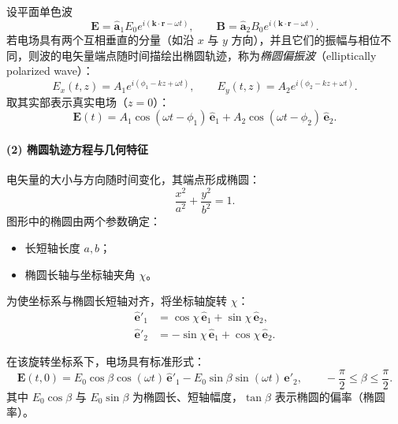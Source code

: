 设平面单色波
\begin{equation}
  \mathbf{E} = \hat{\mathbf{a}}_1 E_0 e^{i(\mathbf{k}\cdot\mathbf{r}-\omega t)}, \qquad
  \mathbf{B} = \hat{\mathbf{a}}_2 B_0 e^{i(\mathbf{k}\cdot\mathbf{r}-\omega t)} .
\end{equation}
若电场具有两个互相垂直的分量（如沿 $x$ 与 $y$ 方向），并且它们的振幅与相位不同，则波的电矢量端点随时间描绘出椭圆轨迹，称为\emph{椭圆偏振波}（elliptically polarized wave）：
\begin{equation}
  E_x(t,z) = A_1 e^{i(\phi_1 - kz + \omega t)},\qquad
  E_y(t,z) = A_2 e^{i(\phi_2 - kz + \omega t)} .
\end{equation}
取其实部表示真实电场（$z=0$）：
\begin{equation}
  \mathbf{E}(t)
  = A_1 \cos(\omega t - \phi_1)\,\hat{\mathbf{e}}_1
  + A_2 \cos(\omega t - \phi_2)\,\hat{\mathbf{e}}_2 .
\end{equation}

\paragraph{(2) 椭圆轨迹方程与几何特征}
电矢量的大小与方向随时间变化，其端点形成椭圆：
\[
\frac{x^2}{a^2}+\frac{y^2}{b^2}=1 .
\]
图形中的椭圆由两个参数确定：
\begin{itemize}[leftmargin=2em]
  \item 长短轴长度 $a,b$；
  \item 椭圆长轴与坐标轴夹角 $\chi$。
\end{itemize}

为使坐标系与椭圆长短轴对齐，将坐标轴旋转 $\chi$：
\begin{equation}
\begin{aligned}
  \hat{\mathbf{e}}'_1 &= \cos\chi\,\hat{\mathbf{e}}_1 + \sin\chi\,\hat{\mathbf{e}}_2,\\
  \hat{\mathbf{e}}'_2 &= -\sin\chi\,\hat{\mathbf{e}}_1 + \cos\chi\,\hat{\mathbf{e}}_2.
\end{aligned}
\end{equation}

在该旋转坐标系下，电场具有标准形式：
\begin{equation}
  \mathbf{E}(t,0)
  = E_0\cos\beta\cos(\omega t)\,\hat{\mathbf{e}}'_1
  - E_0\sin\beta\sin(\omega t)\,\hat{\mathbf{e}}'_2,
  \qquad -\frac{\pi}{2}\le \beta\le \frac{\pi}{2}.
\end{equation}
其中 $E_0\cos\beta$ 与 $E_0\sin\beta$ 为椭圆长、短轴幅度，$\tan\beta$ 表示椭圆的偏率（椭圆率）。

